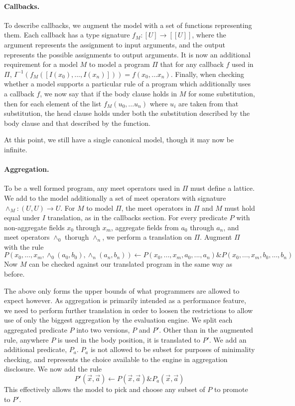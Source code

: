 \paragraph{Callbacks.}
To describe callbacks, we augment the model with a set of functions representing them.
Each callback has a type signature $f_M : [U] \rightarrow [[U]]$, where the argument represents the assignment to input arguments, and the output represents the possible assignments to output arguments.
It is now an additional requirement for a model $M$ to model a program $\Pi$ that for any callback $f$ used in $\Pi$, $I^{-1}(f_M([I(x_0), ...,I(x_n)])) = f(x_0, ... x_n)$.
Finally, when checking whether a model supports a particular rule of a program which additionally uses a callback $f$, we now say that if the body clause holds in $M$ for some substitution, then for each element of the list $f_M(u_0, ... u_n)$ where $u_i$ are taken from that substitution, the head clause holds under both the substitution described by the body clause and that described by the function.

At this point, we still have a single canonical model, though it may now be infinite.
\paragraph{Aggregation.}
To be a well formed program, any meet operators used in $\Pi$ must define a lattice.
We add to the model additionally a set of meet operators with signature $\wedge_M : (U, U) \rightarrow U$.
For $M$ to model $\Pi$, the meet operators in $\Pi$ and $M$ must hold equal under $I$ translation, as in the callbacks section.
For every predicate $P$ with non-aggregate fields $x_0$ through $x_m$, aggregate fields from $a_0$ through $a_n$, and meet operators $\wedge_0$ thorugh $\wedge_n$, we perform a translation on $\Pi$.
Augment $\Pi$ with the rule
\[P(x_0, ..., x_m, \wedge_0(a_0, b_0), \wedge_n(a_n, b_n)) \leftarrow P(x_0, ..., x_m, a_0, ..., a_n) \& P(x_0, ..., x_m, b_0, ..., b_n)\]
Now $M$ can be checked against our translated program in the same way as before.

The above only forms the upper bounds of what programmers are allowed to expect however.
As aggregation is primarily intended as a performance feature, we need to perform further translation in order to loosen the restrictions to allow use of only the biggest aggregation by the evaluation engine.
We split each aggregated predicate $P$ into two versions, $P$ and $P'$.
Other than in the augmented rule, anywhere $P$ is used in the body position, it is translated to $P'$.
We add an additional predicate, $P_a$.
$P_a$ is not allowed to be subset for purposes of minimality checking, and represents the choice available to the engine in aggregation disclosure.
We now add the rule
\[P'(\vec{x}, \vec{a}) \leftarrow P(\vec{x}, \vec{a}) \& P_a(\vec{x}, \vec{a})\]
This effectively allows the model to pick and choose any subset of $P$ to promote to $P'$.

